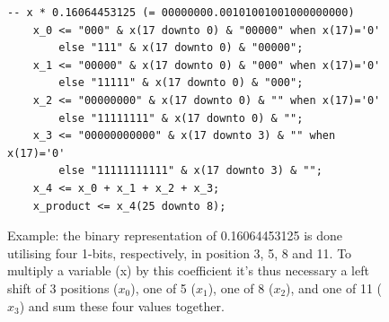 \begin{figure}[hbt!]
    \begin{lstlisting}[basicstyle=\ttfamily\small, linewidth=0.1\textwidth]
    -- x * 0.16064453125 (= 00000000.00101001001000000000)
    x_0 <= "000" & x(17 downto 0) & "00000" when x(17)='0' 
        else "111" & x(17 downto 0) & "00000";
    x_1 <= "00000" & x(17 downto 0) & "000" when x(17)='0' 
        else "11111" & x(17 downto 0) & "000";
    x_2 <= "00000000" & x(17 downto 0) & "" when x(17)='0' 
        else "11111111" & x(17 downto 0) & "";
    x_3 <= "00000000000" & x(17 downto 3) & "" when x(17)='0' 
        else "11111111111" & x(17 downto 3) & "";
    x_4 <= x_0 + x_1 + x_2 + x_3;
    x_product <= x_4(25 downto 8);
    \end{lstlisting}
\caption[Shifter's implementation for fixed coefficient multiplications]{Example: the binary representation of 0.16064453125 is done utilising four 1-bits, respectively, in position 3, 5, 8 and 11. To multiply a variable (x) by this coefficient it’s thus necessary a left shift of 3 positions ($x_{0}$), one of 5 ($x_{1}$), one of 8 ($x_{2}$), and one of 11 ($x_{3}$) and sum these four values together.}
    \label{fig:shift}
\end{figure}

